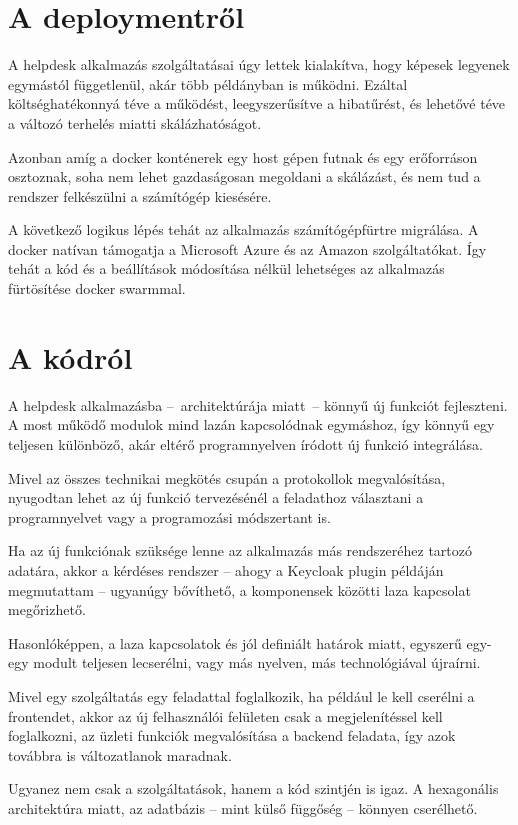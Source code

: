 \section{A deploymentről}

A helpdesk alkalmazás szolgáltatásai úgy lettek kialakítva, hogy képesek legyenek egymástól függetlenül, akár több példányban is működni. Ezáltal költséghatékonnyá téve a működést, leegyszerűsítve a hibatűrést, és lehetővé téve a változó terhelés miatti skálázhatóságot.

Azonban amíg a docker konténerek egy host gépen futnak és egy erőforráson osztoznak, soha nem lehet gazdaságosan megoldani a skálázást, és nem tud a rendszer felkészülni a számítógép kiesésére.

A következő logikus lépés tehát az alkalmazás számítógépfürtre migrálása. A docker natívan támogatja a Microsoft Azure és az Amazon \cite{docker_website_deploy_ECS} szolgáltatókat. Így tehát a kód és a beállítások módosítása nélkül lehetséges az alkalmazás fürtösítése docker swarmmal.

\bigskip
\section{A kódról}
A helpdesk alkalmazásba --~architektúrája miatt~-- könnyű új funkciót fejleszteni. A most működő modulok mind lazán kapcsolódnak egymáshoz, így könnyű egy teljesen különböző, akár eltérő programnyelven íródott új funkció integrálása.

Mivel az összes technikai megkötés csupán a protokollok megvalósítása, nyugodtan lehet az új funkció tervezésénél a feladathoz választani a programnyelvet vagy a programozási módszertant is. 

Ha az új funkciónak szüksége lenne az alkalmazás más rendszeréhez tartozó adatára, akkor a kérdéses rendszer --  ahogy a Keycloak plugin példáján megmutattam --   ugyanúgy bővíthető, a komponensek közötti laza kapcsolat megőrizhető.

Hasonlóképpen, a laza kapcsolatok és jól definiált határok miatt, egyszerű egy-egy modult teljesen lecserélni, vagy más nyelven, más technológiával újraírni.

Mivel egy szolgáltatás egy feladattal foglalkozik, ha például le	 kell cserélni a frontendet, akkor az új felhasználói felületen csak a megjelenítéssel kell foglalkozni, az üzleti funkciók megvalósítása a backend feladata, így azok továbbra is változatlanok maradnak.

Ugyanez nem csak a szolgáltatások, hanem a kód szintjén is igaz. A hexagonális architektúra miatt, az adatbázis --  mint külső függőség --   könnyen cserélhető. 

